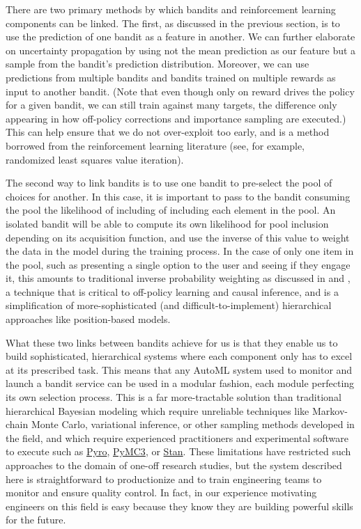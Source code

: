 \documentclass{article}
\begin{document}
There are two primary methods by which bandits and reinforcement learning components can be linked. The first, as discussed in the previous section, is to use the prediction of one bandit as a feature in another. We can further elaborate on uncertainty propagation by using not the mean prediction as our feature but a sample from the bandit's prediction distribution. Moreover, we can use predictions from multiple bandits and bandits trained on multiple rewards as input to another bandit. (Note that even though only on reward drives the policy for a given bandit, we can still train against many targets, the difference only appearing in how off-policy corrections and importance sampling are executed.) This can help ensure that we do not over-exploit too early, and is a method borrowed from the reinforcement learning literature (see, for example, randomized least squares value iteration\cite{RLSVI}).

The second way to link bandits is to use one bandit to pre-select the pool of choices for another. In this case, it is important to pass to the bandit consuming the pool the likelihood of including of including each element in the pool.  An isolated bandit will be able to compute its own likelihood for pool inclusion depending on its acquisition function, and use the inverse of this value to weight the data in the model during the training process. In the case of only one item in the pool, such as presenting a single option to the user and seeing if they engage it, this amounts to traditional inverse probability weighting as discussed in \cite{Mason_Real-World_Reinforcement_Learning_2021} and \cite{sutton_barto_rl}, a technique that is critical to off-policy learning and causal inference, and is a simplification of more-sophisticated (and difficult-to-implement) hierarchical approaches like position-based models\cite{zappella_position_based}.

What these two links between bandits achieve for us is that they enable us to build sophisticated, hierarchical systems where each component only has to excel at its prescribed task. This means that any AutoML system used to monitor and launch a bandit service can be used in a modular fashion, each module perfecting its own selection process. This is a far more-tractable solution than traditional hierarchical Bayesian modeling which require unreliable techniques like Markov-chain Monte Carlo, variational inference, or other sampling methods developed in the field, and which require experienced practitioners and experimental software to execute such as \href{http://www.pyro.ai}{Pyro},  \href{https://docs.pymc.io/en/v3/}{PyMC3}, or \href{https://mc-stan.org}{Stan}. These limitations have restricted such approaches to the domain of one-off research studies, but the system described here is straightforward to productionize and to train engineering teams to monitor and ensure quality control. In fact, in our experience motivating engineers on this field is easy because they know they are building powerful skills for the future.
\end{document}
